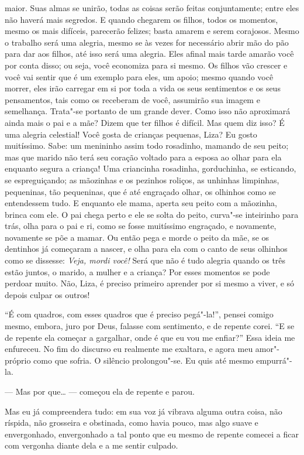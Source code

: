 maior. Suas almas se unirão, todas as coisas serão feitas
conjuntamente; entre eles não haverá mais segredos. E quando chegarem
os filhos, todos os momentos, mesmo os mais difíceis, parecerão
felizes; basta amarem e serem corajosos. Mesmo o trabalho será uma
alegria, mesmo se às vezes for necessário abrir mão do pão para dar aos
filhos, até isso será uma alegria. Eles afinal mais tarde amarão você
por conta disso; ou seja, você economiza para si mesmo. Os filhos vão
crescer e você vai sentir que é um exemplo para eles, um apoio; mesmo
quando você morrer, eles irão carregar em si por toda a vida os seus
sentimentos e os seus pensamentos, tais como os receberam de você,
assumirão sua imagem e semelhança. Trata"-se portanto de um grande
dever. Como isso não aproximará ainda mais o pai e a mãe? Dizem que ter
filhos é difícil. Mas quem diz isso? É uma alegria celestial! Você
gosta de crianças pequenas, Liza? Eu gosto muitíssimo. Sabe: um
menininho assim todo rosadinho, mamando de seu peito; mas que marido
não terá seu coração voltado para a esposa ao olhar para ela enquanto
segura a criança! Uma criancinha rosadinha, gorduchinha, se esticando,
se espreguiçando; as mãozinhas e os pezinhos roliços, as unhinhas
limpinhas, pequeninas, tão pequeninas, que é até engraçado olhar, os
olhinhos como se entendessem tudo. E enquanto ele mama, aperta seu
peito com a mãozinha, brinca com ele. O pai chega perto e ele se solta
do peito, curva"-se inteirinho para trás, olha para o pai e ri, como se
fosse muitíssimo engraçado, e novamente, novamente se põe a mamar. Ou
então pega e morde o peito da mãe, se os dentinhos já começaram a
nascer, e olha para ela com o canto de seus olhinhos como se dissesse:
\textit{Veja, mordi você!} Será que não é tudo alegria quando os três estão
juntos, o marido, a mulher e a criança? Por esses momentos se pode
perdoar muito. Não, Liza, é preciso primeiro aprender por si mesmo a
viver, e só depois culpar os outros!

``É com quadros, com esses quadros que é preciso pegá"-la!'', pensei comigo
mesmo, embora, juro por Deus, falasse com sentimento, e de repente
corei. ``E se de repente ela começar a gargalhar, onde é que eu vou me
enfiar?'' Essa ideia me enfureceu. No fim do discurso eu realmente me
exaltara, e agora meu amor"-próprio como que sofria. O silêncio
prolongou"-se. Eu quis até mesmo empurrá"-la.

--- Mas por que\ldots{} --- começou ela de repente e parou.

Mas eu já compreendera tudo: em sua voz já vibrava alguma outra coisa,
não ríspida, não grosseira e obstinada, como havia pouco, mas algo
suave e envergonhado, envergonhado a tal ponto que eu mesmo de repente
comecei a ficar com vergonha diante dela e a me sentir culpado.

